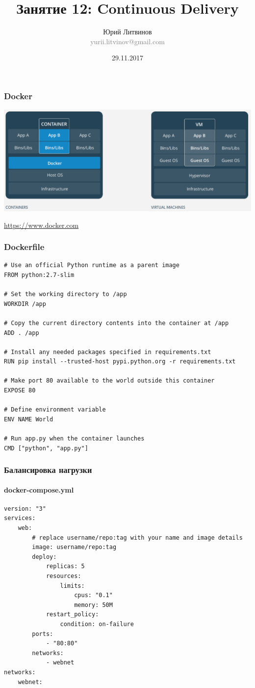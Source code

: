 \documentclass[xetex,mathserif,serif]{beamer}
\title{Занятие 12: Continuous Delivery}
\author[Юрий Литвинов]{Юрий Литвинов\\\small{\textcolor{gray}{yurii.litvinov@gmail.com}}}
\date{29.11.2017}
\newcommand{\attribution}[1] {
	\begin{flushright}\begin{scriptsize}\textcolor{gray}{\textcopyright\; #1}\end{scriptsize}\end{flushright}
}
\begin{document}
	\frame{\titlepage}

	\begin{frame}
		\frametitle{Docker}
		\begin{center}
			\includegraphics[width=\textwidth]{docker.png}
			\attribution{\url{https://www.docker.com}}
		\end{center}
	\end{frame}
	
	\begin{frame}[fragile]
		\frametitle{Dockerfile}
		\begin{scriptsize}
			\begin{verbatim}
# Use an official Python runtime as a parent image
FROM python:2.7-slim

# Set the working directory to /app
WORKDIR /app

# Copy the current directory contents into the container at /app
ADD . /app

# Install any needed packages specified in requirements.txt
RUN pip install --trusted-host pypi.python.org -r requirements.txt

# Make port 80 available to the world outside this container
EXPOSE 80

# Define environment variable
ENV NAME World

# Run app.py when the container launches
CMD ["python", "app.py"]
			\end{verbatim}
		\end{scriptsize}
	\end{frame}

	\begin{frame}[fragile]
		\frametitle{Балансировка нагрузки}
		\framesubtitle{docker-compose.yml}
		\begin{scriptsize}
			\begin{verbatim}
version: "3"
services:
    web:
        # replace username/repo:tag with your name and image details
        image: username/repo:tag
        deploy:
            replicas: 5
            resources:
                limits:
                    cpus: "0.1"
                    memory: 50M
            restart_policy:
                condition: on-failure
        ports:
            - "80:80"
        networks:
            - webnet
networks:
    webnet:
			\end{verbatim}
		\end{scriptsize}
	\end{frame}
\end{document}
